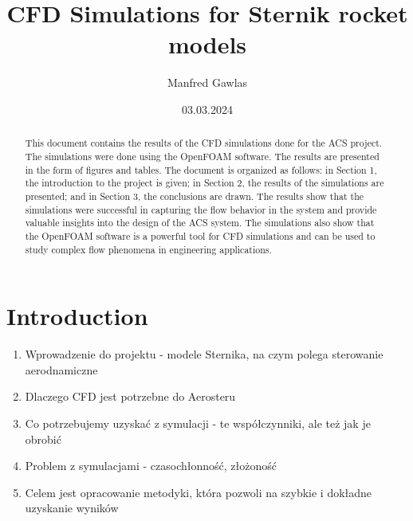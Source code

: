 \documentclass{article}
\title{CFD Simulations for Sternik rocket models}
\author{Manfred Gawlas}
\date{03.03.2024}
\begin{document}
\maketitle

\begin{abstract}
    This document contains the results of the CFD simulations done for the ACS project. The simulations were done using the OpenFOAM software. The results are presented in the form of figures and tables. The document is organized as follows: in Section 1, the introduction to the project is given; in Section 2, the results of the simulations are presented; and in Section 3, the conclusions are drawn. The results show that the simulations were successful in capturing the flow behavior in the system and provide valuable insights into the design of the ACS system. The simulations also show that the OpenFOAM software is a powerful tool for CFD simulations and can be used to study complex flow phenomena in engineering applications.
\end{abstract}

\tableofcontents

\section{Introduction}
\begin{enumerate}
    \item Wprowadzenie do projektu - modele Sternika, na czym polega sterowanie aerodnamiczne
    \item Dlaczego CFD jest potrzebne do Aerosteru
    \item Co potrzebujemy uzyskać z symulacji - te współczynniki, ale też jak 
    je obrobić 
    \item Problem z symulacjami - czasochłonność, złożoność
    \item Celem jest opracowanie metodyki, która pozwoli na szybkie i dokładne
    uzyskanie wyników
\end{enumerate}
\end{document}
